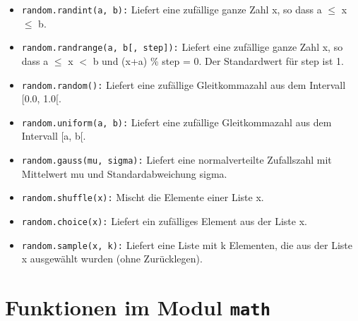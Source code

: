 \documentclass[11pt, oneside]{book}
\begin{document}
\begin{itemize}
    \item \texttt{random.randint(a, b):} Liefert eine zufällige ganze Zahl x, so dass a $\leq$ x $\leq$ b.
    
    \item \texttt{random.randrange(a, b[, step]):} Liefert eine zufällige ganze Zahl x, so dass a $\leq$ x $<$ b und (x+a) \% step = 0. Der Standardwert für step ist 1.
    
    \item \texttt{random.random():} Liefert eine zufällige Gleitkommazahl aus dem Intervall [0.0, 1.0[.
    
    \item \texttt{random.uniform(a, b):} Liefert eine zufällige Gleitkommazahl aus dem Intervall [a, b[.
    
    \item \texttt{random.gauss(mu, sigma):} Liefert eine normalverteilte Zufallszahl mit Mittelwert mu und Standardabweichung sigma.
    
    \item \texttt{random.shuffle(x):} Mischt die Elemente einer Liste x.
    
    \item \texttt{random.choice(x):} Liefert ein zufälliges Element aus der Liste x.
    
    \item \texttt{random.sample(x, k):} Liefert eine Liste mit k Elementen, die aus der Liste x ausgewählt wurden (ohne Zurücklegen).
\end{itemize}

\section{Funktionen im Modul \texttt{math}}
\end{document}
